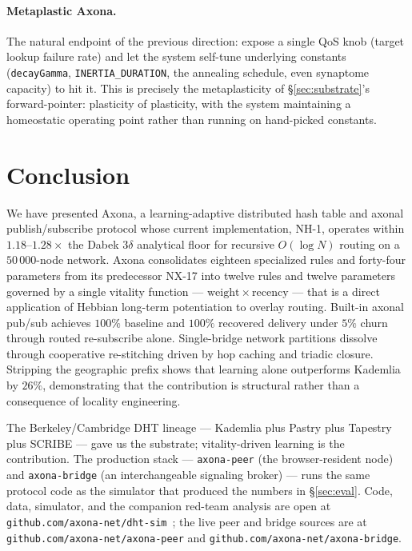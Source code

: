 \documentclass[conference]{IEEEtran}
\newcommand{\axona}{Axona\xspace}
\newcommand{\nhone}{NH-1\xspace}
\newcommand{\NXseventeen}{NX-17\xspace}
\begin{document}
\paragraph{Metaplastic \axona.} The natural endpoint of the previous
direction: expose a single QoS knob (target lookup failure rate) and
let the system self-tune underlying constants
(\texttt{decayGamma}, \texttt{INERTIA\_DURATION}, the annealing
schedule, even synaptome capacity) to hit it. This is precisely the
metaplasticity of \S\ref{sec:substrate}'s
forward-pointer: plasticity of plasticity, with the system maintaining
a homeostatic operating point rather than running on hand-picked
constants.

\section{Conclusion}
\label{sec:conclusion}

We have presented \axona, a learning-adaptive distributed hash table
and axonal publish/subscribe protocol whose current implementation,
\nhone, operates within $1.18$--$1.28\times$ the Dabek $3\delta$
analytical floor for recursive $O(\log N)$ routing on a $50\,000$-node
network. \axona consolidates eighteen specialized rules and
forty-four parameters from its predecessor \NXseventeen into twelve rules
and twelve parameters governed by a single vitality function ---
$\mathrm{weight} \times \mathrm{recency}$ --- that is a direct
application of Hebbian long-term potentiation to overlay routing.
Built-in axonal pub/sub achieves $100\%$ baseline and $100\%$
recovered delivery under $5\%$ churn through routed re-subscribe alone.
Single-bridge network partitions dissolve through cooperative
re-stitching driven by hop caching and triadic closure. Stripping the
geographic prefix shows that learning alone outperforms Kademlia by
$26\%$, demonstrating that the contribution is structural rather than
a consequence of locality engineering.

The Berkeley/Cambridge DHT lineage --- Kademlia plus Pastry plus
Tapestry plus SCRIBE --- gave us the substrate; vitality-driven
learning is the contribution. The production stack ---
\texttt{axona-peer} (the browser-resident node) and
\texttt{axona-bridge} (an interchangeable signaling broker) ---
runs the same protocol code as the simulator that produced the
numbers in \S\ref{sec:eval}. Code, data, simulator, and the
companion red-team analysis are open at
\texttt{github.com/axona-net/dht-sim}~\cite{dhtsim2026}; the live
peer and bridge sources are at \texttt{github.com/axona-net/axona-peer}
and \texttt{github.com/axona-net/axona-bridge}.



\end{document}

